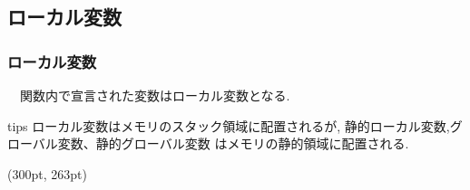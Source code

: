 \documentclass[dvipdfmx]{beamer}
\begin{document}
\subsection{ローカル変数}
\begin{frame}[t, fragile]
    \frametitle{ローカル変数}
    　関数内で宣言された変数はローカル変数となる.
    \begin{table}
    \centering
    \end{table}
    \begin{itembox}[l]{tips}
        ローカル変数はメモリのスタック領域に配置されるが,
            静的ローカル変数,グローバル変数、静的グローバル変数
            はメモリの静的領域に配置される.
    \end{itembox}
    \begin{textblock*}{0.3\linewidth}(300pt, 263pt)
    \space
    \end{textblock*}
\end{frame}
\end{document}
